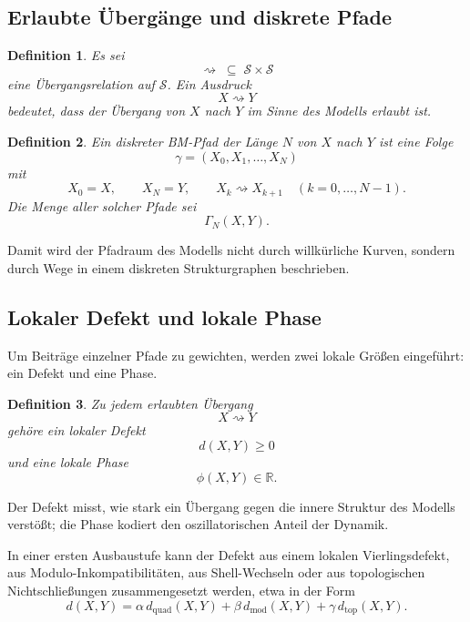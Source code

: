 \documentclass[11pt,a4paper]{article}
\newtheorem{definition}{Definition}
\theoremstyle{remark}
\begin{document}
	\subsection{Erlaubte Übergänge und diskrete Pfade}
	
	\begin{definition}
		Es sei
		\[
		\rightsquigarrow \;\subseteq\; \mathcal S\times\mathcal S
		\]
		eine Übergangsrelation auf \(\mathcal S\). 
		Ein Ausdruck
		\[
		X\rightsquigarrow Y
		\]
		bedeutet, dass der Übergang von \(X\) nach \(Y\) im Sinne des Modells erlaubt ist.
	\end{definition}
	
	\begin{definition}
		Ein \emph{diskreter BM-Pfad} der Länge \(N\) von \(X\) nach \(Y\) ist eine Folge
		\[
		\gamma=(X_0,X_1,\dots,X_N)
		\]
		mit
		\[
		X_0=X,\qquad X_N=Y,
		\qquad X_k\rightsquigarrow X_{k+1}\quad (k=0,\dots,N-1).
		\]
		Die Menge aller solcher Pfade sei
		\[
		\Gamma_N(X,Y).
		\]
	\end{definition}
	
	Damit wird der Pfadraum des Modells nicht durch willkürliche Kurven, sondern durch Wege in einem diskreten Strukturgraphen beschrieben.
	
	\subsection{Lokaler Defekt und lokale Phase}
	
	Um Beiträge einzelner Pfade zu gewichten, werden zwei lokale Größen eingeführt: ein Defekt und eine Phase.
	
	\begin{definition}
		Zu jedem erlaubten Übergang
		\[
		X\rightsquigarrow Y
		\]
		gehöre ein \emph{lokaler Defekt}
		\[
		d(X,Y)\ge 0
		\]
		und eine \emph{lokale Phase}
		\[
		\phi(X,Y)\in\mathbb R.
		\]
	\end{definition}
	
	Der Defekt misst, wie stark ein Übergang gegen die innere Struktur des Modells verstößt; die Phase kodiert den oszillatorischen Anteil der Dynamik.
	
	In einer ersten Ausbaustufe kann der Defekt aus einem lokalen Vierlingsdefekt, aus Modulo-Inkompatibilitäten, aus Shell-Wechseln oder aus topologischen Nichtschließungen zusammengesetzt werden, etwa in der Form
	\[
	d(X,Y)
	=
	\alpha\, d_{\mathrm{quad}}(X,Y)
	+\beta\, d_{\mathrm{mod}}(X,Y)
	+\gamma\, d_{\mathrm{top}}(X,Y).
	\]
	
\end{document}
